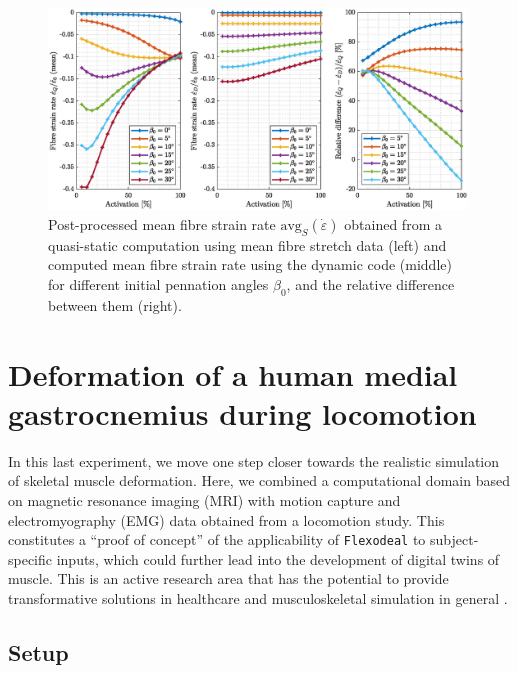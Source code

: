 \documentclass{sfuthesis}
\numberwithin{equation}{section}
\numberwithin{figure}{chapter}
\numberwithin{table}{chapter}
\theoremstyle{definition}
\newcommand{\depsilon}{\dot{\varepsilon}}
\begin{document}
\begin{figure}
    \centering
    \includegraphics[width=0.99\textwidth]{ic-mean-fibre-strain-rate.eps}
    \caption{Post-processed mean fibre strain rate $\mathrm{avg}_S(\depsilon)$ obtained from a quasi-static computation using mean fibre stretch data (left) and computed mean fibre strain rate using the dynamic code (middle) for different initial pennation angles $\beta_0$, and the relative difference between them (right).
    \label{fig:ic-mean-fibre-strain-rate-slab}}
\end{figure}


\section{Deformation of a human medial gastrocnemius during locomotion} \label{sec:flexodeal_mri}

In this last experiment, we move one step closer towards the realistic simulation of skeletal muscle deformation. Here, we combined a computational domain based on magnetic resonance imaging (MRI) with motion capture and electromyography (EMG) data obtained from a locomotion study. This constitutes a ``proof of concept'' of the applicability of \texttt{Flexodeal} to subject-specific inputs, which could further lead into the development of digital twins of muscle. This is an active research area that has the potential to provide transformative solutions in healthcare and musculoskeletal simulation in general \cite{Diniz2025DigitalTwin}.

\subsection{Setup}
\end{document}
